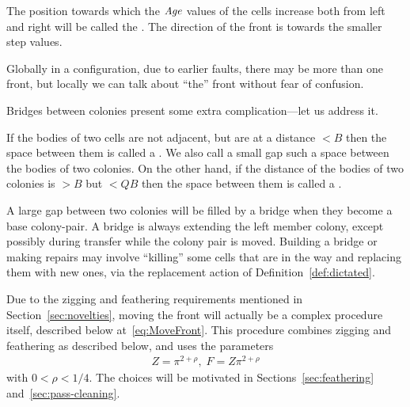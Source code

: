 \documentclass[11pt]{memoir}
\theoremstyle{definition} %
\newcommand{\fld}[1]{\ensuremath{\textit{#1\/}}}
\def\B{B}
\newcommand{\F}{F}
\newcommand{\passno}{\pi}
\newcommand{\Q}{Q} %
\newcommand{\Z}{Z} %
\newcommand{\dir}{\mathrm{dir}} %
\newcommand{\Age}{\fld{Age}} %
\newcommand{\Sweep}{\fld{Sweep}} %
\begin{document}

\begin{definition}[Front]\label{def:front}
  The position towards which the \( \Age \) values of the cells increase both
  from left and right will be called the .
  The direction of the front is towards the smaller step values.
\end{definition}

Globally in a configuration, due to earlier faults, there may be more than one front, but locally
we can talk about ``the'' front without fear of confusion.

 Bridges between colonies present some extra complication---let us address it.

\begin{definition}[Gaps]\label{def:gaps}
If the bodies of two cells are not adjacent, but are at a distance \( <\B \) then the space
between them is called a .
We also call a small gap such a space between the bodies of two colonies.
On the other hand, if the distance of the bodies of two colonies is \( >\B \) 
but \( <\Q\B \) then the space between them is called a .
\end{definition}

A large gap between two colonies will be filled by a bridge when they become a base colony-pair.
A bridge is always extending the left member colony, except possibly during transfer while
the colony pair is moved.
Building a bridge or making repairs may involve
``killing'' some cells that are in the way and replacing them with new ones, via
the replacement action of Definition~\ref{def:dictated}.

Due to the zigging and feathering requirements mentioned in Section~\ref{sec:novelties},
moving the front will actually be a complex procedure itself, described below at~\eqref{eq:MoveFront}.
This procedure combines zigging and feathering as described below, and
uses the parameters
\begin{align}\label{eq:FDef}
 \Z = \passno^{2+\rho},\; \F = \Z\passno^{2+\rho}
\end{align}
with \( 0<\rho<1/4 \).
The choices will be motivated in Sections~\ref{sec:feathering} and~\ref{sec:pass-cleaning}.
\end{document}
